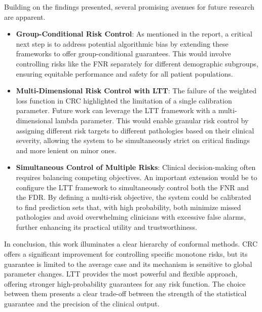 Building on the findings presented, several promising avenues for future research are apparent.

\begin{itemize}
    \item \textbf{Group-Conditional Risk Control}:
    As mentioned in the report, a critical next step is to address potential algorithmic bias
    by extending these frameworks to offer group-conditional guarantees.
    This would involve controlling risks like the FNR separately
    for different demographic subgroups,
    ensuring equitable performance and safety for all patient populations.

    \item \textbf{Multi-Dimensional Risk Control with LTT}:
    The failure of the weighted loss function in CRC highlighted the limitation
    of a single calibration parameter.
    Future work can leverage the LTT framework with a multi-dimensional lambda parameter.
    This would enable granular risk control by assigning different risk targets
    to different pathologies based on their clinical severity,
    allowing the system to be simultaneously strict
    on critical findings and more lenient on minor ones.

    \item \textbf{Simultaneous Control of Multiple Risks}:
    Clinical decision-making often requires balancing competing objectives.
    An important extension would be to configure the LTT framework
    to simultaneously control both the FNR and the FDR.
    By defining a multi-risk objective,
    the system could be calibrated to find prediction sets that,
    with high probability, both minimize missed pathologies
    and avoid overwhelming clinicians with excessive false alarms,
    further enhancing its practical utility and trustworthiness.
\end{itemize}

In conclusion, this work illuminates a clear hierarchy of conformal methods.
CRC offers a significant improvement for controlling specific monotone risks,
but its guarantee is limited to the average case
and its mechanism is sensitive to global parameter changes.
LTT provides the most powerful and flexible approach,
offering stronger high-probability guarantees for any risk function.
The choice between them presents a clear trade-off between
the strength of the statistical guarantee and the precision of the clinical output.
